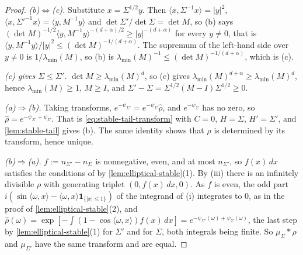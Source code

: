 \begin{proof}
\leanok
\emph{(b)$\Leftrightarrow$(c).} Substitute $x = \Sigma^{1/2}y$. Then
$\langle x,\Sigma^{-1}x\rangle = |y|^2$, $\langle x,\Sigma'^{-1}x\rangle = \langle y,M^{-1}y\rangle$ and
$\det\Sigma'/\det\Sigma = \det M$, so (b) says
$(\det M)^{-1/2}\langle y,M^{-1}y\rangle^{-(d+\alpha)/2} \ge |y|^{-(d+\alpha)}$ for every $y \ne 0$, that
is $\langle y,M^{-1}y\rangle/|y|^2 \le (\det M)^{-1/(d+\alpha)}$. The supremum of the left-hand side
over $y \ne 0$ is $1/\lambda_{\min}(M)$, so (b) is $\lambda_{\min}(M)^{-1} \le (\det M)^{-1/(d+\alpha)}$, which
is (c).

\emph{(c) gives $\Sigma \le \Sigma'$.} $\det M \ge \lambda_{\min}(M)^d$, so (c) gives
$\lambda_{\min}(M)^{d+\alpha} \ge \lambda_{\min}(M)^d$, hence $\lambda_{\min}(M) \ge 1$, $M \ge I$, and
$\Sigma' - \Sigma = \Sigma^{1/2}(M - I)\Sigma^{1/2} \ge 0$.

\emph{(a)$\Rightarrow$(b).} Taking transforms, $e^{-\psi_{\Sigma'}} = e^{-\psi_\Sigma}\widehat\rho$, and
$e^{-\psi_\Sigma}$ has no zero, so $\widehat\rho = e^{-\psi_{\Sigma'} + \psi_\Sigma}$. That is
\ref{eq:stable-tail-transform} with $C = 0$, $H = \Sigma$, $H' = \Sigma'$, and
\ref{lem:stable-tail} gives (b). The same identity shows that $\rho$ is determined by its transform,
hence unique.

\emph{(b)$\Rightarrow$(a).} $f := n_{\Sigma'} - n_\Sigma$ is nonnegative, even, and at most
$n_{\Sigma'}$, so $f(x)\,dx$ satisfies the conditions of  by
\ref{lem:elliptical-stable}(1). By (iii) there is an infinitely divisible $\rho$ with
generating triplet $(0, f(x)\,dx, 0)$. As $f$ is even, the odd part
$i(\sin\langle\omega,x\rangle - \langle\omega,x\rangle\mathbf 1_{\{|x| \le 1\}})$ of the integrand of
(i) integrates to $0$, as in the proof of \ref{lem:elliptical-stable}(2), and
$\widehat\rho(\omega) = \exp[-\int(1 - \cos\langle\omega,x\rangle)f(x)\,dx]
= e^{-\psi_{\Sigma'}(\omega) + \psi_\Sigma(\omega)}$, the last step by \ref{lem:elliptical-stable}(1)
for $\Sigma'$ and for $\Sigma$, both integrals being finite. So $\mu_\Sigma * \rho$ and
$\mu_{\Sigma'}$ have the same transform and are equal.


\end{proof}
